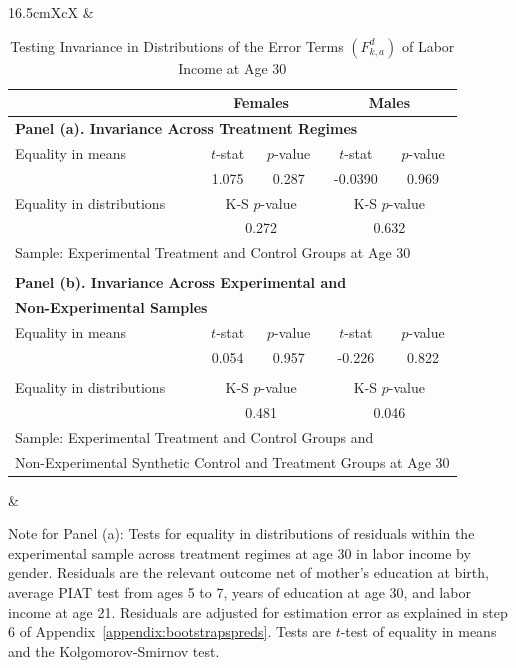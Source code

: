 \begin{table}[!htpb]
\begin{threeparttable}
\caption{Testing Invariance in Distributions of the  Error Terms $\left( F_{k,a}^d \right)$ of Labor Income at Age 30} \label{table:invarianceerrors}
\centering
\footnotesize
\begin{tabularx}{16.5cm}{XcX}
& \begin{tabular}{lcccc} \toprule
& \multicolumn{2}{c}{Females} &   \multicolumn{2}{c}{Males} \\ \midrule
\multicolumn{5}{l}{\textbf{Panel (a). Invariance Across Treatment Regimes}} \\ 
 Equality in means & $t$-stat & $p$-value & $t$-stat & $p$-value \\ 
 & 1.075 & 0.287 & -0.0390 &  0.969  \\ 
Equality in distributions & \multicolumn{2}{c}{K-S $p$-value} &  \multicolumn{2}{c}{K-S $p$-value}  \\
                                      & \multicolumn{2}{c}{0.272} &  \multicolumn{2}{c}{0.632}  \\ 
\multicolumn{5}{l}{Sample: Experimental Treatment and Control Groups at Age 30} \\ \\
\multicolumn{5}{l}{\textbf{Panel (b). Invariance Across Experimental and }} \\ 
\multicolumn{5}{l}{\textbf{Non-Experimental Samples}} \\ 
Equality in means & $t$-stat & $p$-value & $t$-stat & $p$-value \\
 & 0.054  & 0.957 & -0.226 & 0.822   \\ \\
Equality in distributions & \multicolumn{2}{c}{K-S $p$-value} &  \multicolumn{2}{c}{K-S $p$-value}  \\
                                      & \multicolumn{2}{c}{0.481} &  \multicolumn{2}{c}{0.046}  \\                    
\multicolumn{5}{l}{Sample: Experimental Treatment and Control Groups and} \\ 
\multicolumn{5}{l}{Non-Experimental Synthetic Control and Treatment Groups at Age 30 } \\ \bottomrule
\end{tabular} & 
\end{tabularx}
\begin{tablenotes}
\footnotesize
\item Note for Panel (a): Tests for equality in distributions of residuals within the experimental sample across treatment regimes at age 30 in labor income by gender. Residuals are the relevant outcome net of mother's education at birth, average PIAT test from ages 5 to 7, years of education at age 30, and labor income at age 21. Residuals are adjusted for estimation error as explained in step 6 of Appendix~\ref{appendix:bootstrapspreds}. Tests are $t$-test of equality in means and the Kolgomorov-Smirnov test.\\

\end{tablenotes}
\end{threeparttable}
\end{table}
